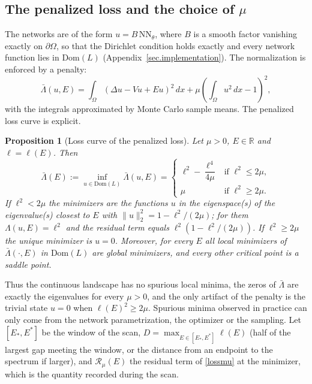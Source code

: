 \documentclass[10pt]{amsart}
\theoremstyle{definition}
\theoremstyle{remark}
\theoremstyle{plain}
\newtheorem{proposition}[theorem]{Proposition}
\newcommand{\R}{\mathbb{R}}
\begin{document}
\subsection{The penalized loss and the choice of \texorpdfstring{$\mu$}{mu}}
The networks are of the form $u=B\,\mathrm{NN}_\theta$, where $B$ is a smooth factor vanishing exactly
on $\partial\Omega$, so that the Dirichlet condition holds exactly and every network function lies in
$\mathrm{Dom}(L)$ (Appendix~\ref{sec.implementation}). The normalization is enforced by a penalty:
\begin{equation}\label{lossmu}
\bar \Lambda(u, E) = \int_\Omega (\Delta u -Vu + Eu)^2\, dx + \mu\left(\int_\Omega u^2\, dx - 1\right)^2,
\end{equation}
with the integrals approximated by Monte Carlo sample means. The penalized loss curve is explicit.

\begin{proposition}[Loss curve of the penalized loss]\label{prop.penalized}
Let $\mu>0$, $E\in\R$ and $\ell=\ell(E)$. Then
\[
\bar\Lambda(E):=\inf_{u\in \mathrm{Dom}(L)}\bar\Lambda(u,E)=
\begin{cases}
\ell^2-\dfrac{\ell^4}{4\mu} & \text{if } \ell^2\le 2\mu,\\[2mm]
\mu & \text{if } \ell^2\ge 2\mu .
\end{cases}
\]
If $\ell^2<2\mu$ the minimizers are the functions $u$ in the eigenspace(s) of the eigenvalue(s)
closest to $E$ with $\|u\|_2^2=1-\ell^2/(2\mu)$; for them $\Lambda(u,E)=\ell^2$ and the residual term
equals $\ell^2(1-\ell^2/(2\mu))$. If $\ell^2\ge2\mu$ the unique minimizer is $u=0$. Moreover, for every $E$
all local minimizers of $\bar\Lambda(\cdot,E)$ in $\mathrm{Dom}(L)$ are global minimizers, and every other
critical point is a saddle point.
\end{proposition}

Thus the continuous landscape has no spurious local minima, the zeros of $\bar\Lambda$ are exactly
the eigenvalues for every $\mu>0$, and the only artifact of the penalty is the trivial state $u=0$
when $\ell(E)^2\ge2\mu$. Spurious minima observed in practice can only come from the network
parametrization, the optimizer or the sampling. Let $[E_*,E^*]$ be the window of the scan,
$D=\max_{E\in[E_*,E^*]}\ell(E)$ (half of the largest gap meeting the window, or the distance from an
endpoint to the spectrum if larger), and $\mathcal R_\mu(E)$ the residual term of \eqref{lossmu} at the
minimizer, which is the quantity recorded during the scan.
\end{document}
